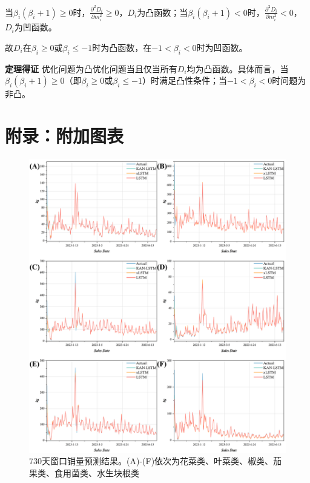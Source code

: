 \documentclass[lang=cn,12pt,a4paper]{elegantpaper}
\begin{document}
当$\beta_i (\beta_i + 1) \geq 0$时，$\frac{\partial^2 D_i}{\partial m_i^2} \geq 0$，$D_i$为凸函数；当$\beta_i (\beta_i + 1) < 0$时，$\frac{\partial^2 D_i}{\partial m_i^2} < 0$，$D_i$为凹函数。

故$D_i$在$\beta_i \geq 0$或$\beta_i \leq -1$时为凸函数，在$-1 < \beta_i < 0$时为凹函数。

\textbf{定理得证}
优化问题为凸优化问题当且仅当所有$D_i$均为凸函数。具体而言，当$\beta_i (\beta_i + 1) \geq 0$（即$\beta_i \geq 0$或$\beta_i \leq -1$）时满足凸性条件；当$-1 < \beta_i < 0$时问题为非凸。

\section{附录：附加图表}
\label{sec:appendix_figures}

\begin{figure}[H]
    \centering
    \includegraphics[width=1\textwidth]{图片10.png}
    \caption{730天窗口销量预测结果。(A)-(F)依次为花菜类、叶菜类、椒类、茄果类、食用菌类、水生块根类}
    \label{fig:fig10}
\end{figure}
\end{document}
